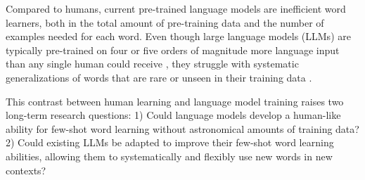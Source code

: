 \documentclass{article}
\begin{document}

Compared to humans, current pre-trained language models are inefficient word learners, both in the total amount of pre-training data and the number of examples needed for each word.
Even though large language models (LLMs) are typically pre-trained on four or five orders of magnitude more language input than any single human could receive \citep{linzen2020accelerate,Frank2023BridgingTD}, they struggle with systematic generalizations of words that are rare or unseen in their training data \citep{wei-etal-2021-frequency,Razeghi2022ImpactOP,Kim2022UncontrolledLE,Batsuren2024EvaluatingST,Land2024FishingFM}.

This contrast between human learning and language model training raises two long-term research questions:
 1) Could language models develop a human-like ability for few-shot word learning without astronomical amounts of training data?
 2) Could existing LLMs be adapted to improve their few-shot word learning abilities, allowing them to systematically and flexibly use new words in new contexts?
\end{document}
